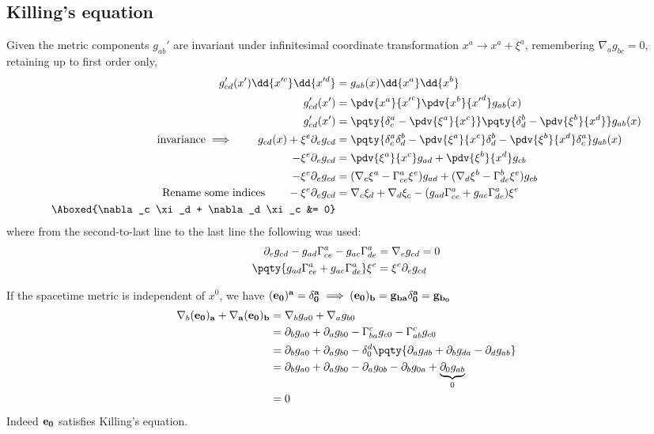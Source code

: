 \documentclass[12pt]{article}
\begin{document}
        \subsection{Killing's equation} Given the metric components \(g_{ab}' \) are invariant under infinitesimal coordinate transformation \(x^a \to x^a + \xi^a\), remembering \(\nabla_a g_{bc} = 0\), retaining up to first order only,
        \begin{align*}
            g_{cd}'(x') \dd{x^{\prime c}} \dd{x^{\prime d}} &= g_{ab} (x) \dd{x^a} \dd{x^b}\\
            g_{cd}' (x')&= \pdv{x^a}{{x'}^c} \pdv{x^b}{{x'}^d} g_{ab}(x)\\
            g_{cd}' (x')&= \pqty{\delta^a_c - \pdv{\xi^a}{x^c}} \pqty{\delta^b_d - \pdv{\xi^b}{x^d}} g_{ab}(x)\\
            \text{invariance} \implies  \qquad g_{cd} (x) + \xi^e \partial_e g_{cd}&= \pqty{\delta^a_c\delta^b_d - \pdv{\xi^a}{x^c} \delta^b_d - \pdv{\xi^b}{x^d} \delta^a_c} g_{ab}(x)\\
            - \xi^e \partial_e g_{cd}&= \pdv{\xi^a}{x^c} g_{ad} + \pdv{\xi^b}{x^d} g_{c b}\\
            - \xi^e \partial_e g_{cd}&=  (\nabla_c \xi^a -\Gamma^{a}_{ce} \xi^e) g_{ad} + (\nabla_d \xi^b -\Gamma^{b}_{de} \xi^e) g_{c b}\\
            \text{Rename some indices} \qquad - \xi^e \partial_e g_{cd}&=  \nabla_c \xi_d + \nabla_d \xi_c - ( g_{ad}\Gamma^{a}_{ce}  + g_{ac}\Gamma^{a}_{de}) \xi^e \\
            \Aboxed{\nabla_c \xi_d + \nabla_d \xi_c &= 0}
        \end{align*}
        where from the second-to-last line to the last line the following was used:
        \begin{align*}
            \partial_e g_{cd} - g_{ad}\Gamma^{a}_{ce}  - g_{ac}\Gamma^{a}_{de} &= \nabla_e g_{cd} = 0\\
            \pqty{g_{ad}\Gamma^{a}_{ce}  + g_{ac}\Gamma^{a}_{de}} \xi^e &= \xi^e \partial_e g_{cd} 
        \end{align*}

        If the spacetime metric is independent of \(x^0\), we have \((\bf e_0)^a = \delta^a_0 \implies  (\bf e_0)_b = g_{ba} \delta^a_0 = g_{b_0}\)
        \begin{align*}
            \nabla_b (\bf e_0)_a + \nabla_a (\bf e_0)_b &= \nabla_b g_{a 0} + \nabla_a g_{b 0}\\
            &= \partial_b g_{a 0} + \partial_a g_{b 0} -\Gamma^{c}_{ba} g_{c 0} -\Gamma^{c}_{ab} g_{c 0}\\
            &= \partial_b g_{a 0} + \partial_a g_{b 0} - \delta^d_0 \pqty{\partial_a g_{db} + \partial_b g_{da} - \partial_d g_{ab}} \\
            &= \partial_b g_{a 0} + \partial_a g_{b 0} - \partial_a g_{0b} - \partial_b g_{0a} + \underbrace{\partial_0 g_{ab}}_{0} \\
            &= 0
        \end{align*}
        Indeed \(\bf e_0\) satisfies Killing's equation.
\end{document}
